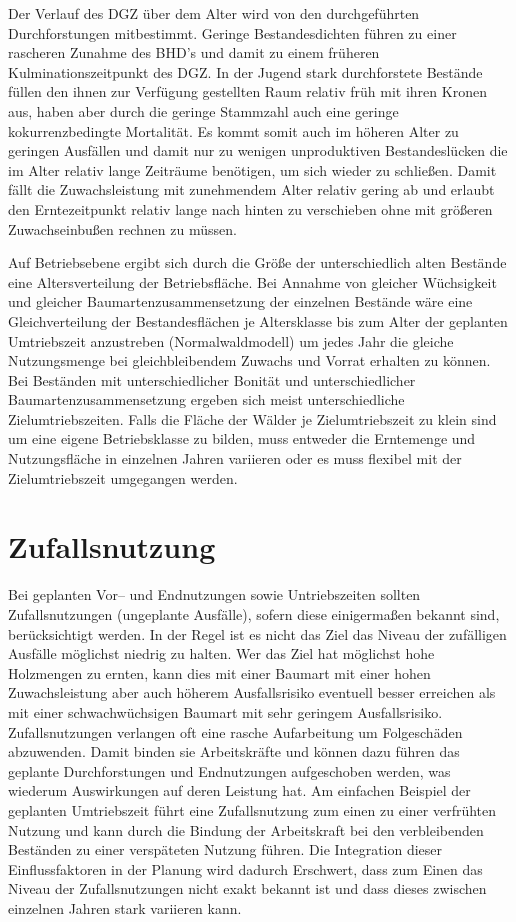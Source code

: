 \documentclass[twocolumn]{scrartcl}
\begin{document}
Der Verlauf des DGZ über dem Alter wird von den durchgeführten Durchforstungen
mitbestimmt. Geringe Bestandesdichten führen zu einer rascheren Zunahme des
BHD's und damit zu einem früheren Kulminationszeitpunkt des DGZ. In der Jugend
stark durchforstete Bestände füllen den ihnen zur Verfügung gestellten Raum
relativ früh mit ihren Kronen aus, haben aber durch die geringe Stammzahl auch
eine geringe kokurrenzbedingte Mortalität. Es kommt somit auch im höheren Alter
zu geringen Ausfällen und damit nur zu wenigen unproduktiven Bestandeslücken die
im Alter relativ lange Zeiträume benötigen, um sich wieder zu schließen. Damit
fällt die Zuwachsleistung mit zunehmendem Alter relativ gering ab und erlaubt
den Erntezeitpunkt relativ lange nach hinten zu verschieben ohne mit größeren
Zuwachseinbußen rechnen zu müssen.

Auf Betriebsebene ergibt sich durch die Größe der unterschiedlich alten Bestände
eine Altersverteilung der Betriebsfläche. Bei Annahme von gleicher Wüchsigkeit
und gleicher Baumartenzusammensetzung der einzelnen Bestände wäre eine
Gleichverteilung der Bestandesflächen je Altersklasse bis zum Alter der
geplanten Umtriebszeit anzustreben (Normalwaldmodell) um jedes Jahr die gleiche
Nutzungsmenge bei gleichbleibendem Zuwachs und Vorrat erhalten zu können. Bei
Beständen mit unterschiedlicher Bonität und unterschiedlicher
Baumartenzusammensetzung ergeben sich meist unterschiedliche Zielumtriebszeiten.
Falls die Fläche der Wälder je Zielumtriebszeit zu klein sind um eine eigene
Betriebsklasse zu bilden, muss entweder die Erntemenge und Nutzungsfläche in
einzelnen Jahren variieren oder es muss flexibel mit der Zielumtriebszeit
umgegangen werden.

\section{Zufallsnutzung}

Bei geplanten Vor-- und Endnutzungen sowie Untriebszeiten sollten
Zufallsnutzungen (ungeplante Ausfälle), sofern diese einigermaßen bekannt sind,
berücksichtigt werden. In der Regel ist es nicht das Ziel das Niveau der
zufälligen Ausfälle möglichst niedrig zu halten. Wer das Ziel hat möglichst hohe
Holzmengen zu ernten, kann dies mit einer Baumart mit einer hohen
Zuwachsleistung aber auch höherem Ausfallsrisiko eventuell besser erreichen als
mit einer schwachwüchsigen Baumart mit sehr geringem Ausfallsrisiko.
Zufallsnutzungen verlangen oft eine rasche Aufarbeitung um Folgeschäden
abzuwenden. Damit binden sie Arbeitskräfte und können dazu führen das geplante
Durchforstungen und Endnutzungen aufgeschoben werden, was wiederum Auswirkungen
auf deren Leistung hat. Am einfachen Beispiel der geplanten Umtriebszeit führt
eine Zufallsnutzung zum einen zu einer verfrühten Nutzung und kann durch die
Bindung der Arbeitskraft bei den verbleibenden Beständen zu einer verspäteten
Nutzung führen. Die Integration dieser Einflussfaktoren in der Planung wird
dadurch Erschwert, dass zum Einen das Niveau der Zufallsnutzungen nicht exakt
bekannt ist und dass dieses zwischen einzelnen Jahren stark variieren kann.
\end{document}
